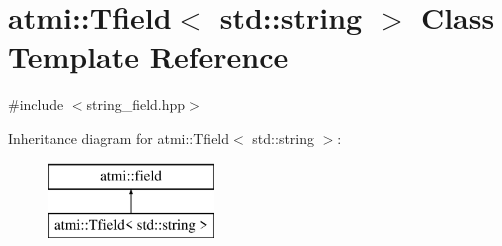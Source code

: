 \hypertarget{classatmi_1_1_tfield_3_01std_1_1string_01_4}{\section{atmi\+:\+:Tfield$<$ std\+:\+:string $>$ Class Template Reference}
\label{classatmi_1_1_tfield_3_01std_1_1string_01_4}
}


 




{\ttfamily \#include $<$string\+\_\+field.\+hpp$>$}

Inheritance diagram for atmi\+:\+:Tfield$<$ std\+:\+:string $>$\+:\begin{figure}[H]
\begin{center}
\leavevmode
\includegraphics[height=2.000000cm]{classatmi_1_1_tfield_3_01std_1_1string_01_4}
\end{center}
\end{figure}
